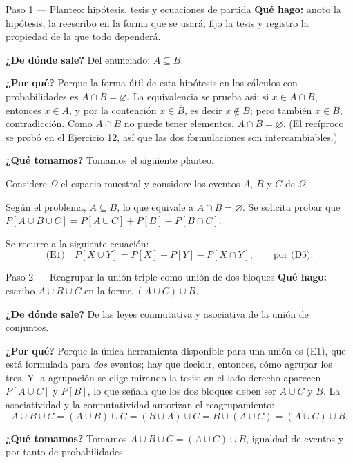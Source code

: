 \documentclass[11pt]{article}
\begin{document}
\begin{sol}

\begin{paso}{Paso 1 --- Planteo: hipótesis, tesis y ecuaciones de partida}
\textbf{Qué hago:} anoto la hipótesis, la reescribo en la forma que se usará, fijo la tesis y
registro la propiedad de la que todo dependerá.

\textbf{¿De dónde sale?} Del enunciado: $A\subseteq\overline{B}$.

\textbf{¿Por qué?} Porque la forma útil de esta hipótesis en los cálculos con probabilidades es
$A\cap B=\varnothing$. La equivalencia se prueba así: si $x\in A\cap B$, entonces $x\in A$, y
por la contención $x\in\overline{B}$, es decir $x\notin B$; pero también $x\in B$, contradicción.
Como $A\cap B$ no puede tener elementos, $A\cap B=\varnothing$. (El recíproco se probó en el
Ejercicio 12, así que las dos formulaciones son intercambiables.)

\textbf{¿Qué tomamos?} Tomamos el siguiente planteo.

\medskip
Considere $\Omega$ el espacio muestral y considere los eventos $A$, $B$ y $C$ de $\Omega$.

Según el problema, $A\subseteq\overline{B}$, lo que equivale a $A\cap B=\varnothing$. Se solicita
probar que $P[A\cup B\cup C]=P[A\cup C]+P[B]-P[B\cap C]$.

\medskip
Se recurre a la siguiente ecuación:
\[
\text{(E1)}\quad P[X\cup Y]=P[X]+P[Y]-P[X\cap Y],\qquad\text{por (D5).}
\]
\end{paso}

\begin{paso}{Paso 2 --- Reagrupar la unión triple como unión de dos bloques}
\textbf{Qué hago:} escribo $A\cup B\cup C$ en la forma $(A\cup C)\cup B$.

\textbf{¿De dónde sale?} De las leyes conmutativa y asociativa de la unión de conjuntos.

\textbf{¿Por qué?} Porque la única herramienta disponible para una unión es (E1), que está
formulada para \emph{dos} eventos; hay que decidir, entonces, cómo agrupar los tres. Y la
agrupación se elige mirando la tesis: en el lado derecho aparecen $P[A\cup C]$ y $P[B]$, lo que
señala que los dos bloques deben ser $A\cup C$ y $B$. La asociatividad y la conmutatividad
autorizan el reagrupamiento:
\[
A\cup B\cup C=(A\cup B)\cup C=(B\cup A)\cup C=B\cup(A\cup C)=(A\cup C)\cup B .
\]

\textbf{¿Qué tomamos?} Tomamos $A\cup B\cup C=(A\cup C)\cup B$, igualdad de eventos y por tanto
de probabilidades.
\end{paso}


\end{sol}
\end{document}
